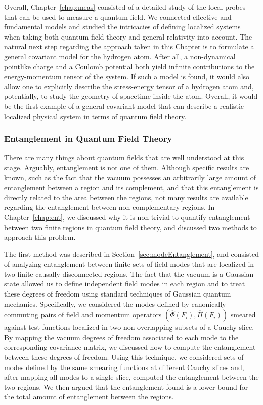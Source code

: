 \documentclass[letterpaper,12pt,titlepage,oneside,final]{book}
\begin{document}
Overall, Chapter~\ref{chap:meas} consisted of a detailed study of the local probes that can be used to measure a quantum field. We connected effective and fundamental models and studied the intricacies of defining localized systems when taking both quantum field theory and general relativity into account. The natural next step regarding the approach taken in this Chapter is to formulate a general covariant model for the hydrogen atom. After all, a non-dynamical pointlike charge and a Coulomb potential both yield infinite contributions to the energy-momentum tensor of the system. If such a model is found, it would also allow one to explicitly describe the stress-energy tensor of a hydrogen atom and, potentially, to study the geometry of spacetime inside the atom. Overall, it would be the first example of a general covariant model that can describe a realistic localized physical system in terms of quantum field theory.

\subsubsection*{Entanglement in Quantum Field Theory}

There are many things about quantum fields that are well understood at this stage. Arguably, entanglement is not one of them. Although specific results are known, such as the fact that the vacuum possesses an arbitrarily large amount of entanglement between a region and its complement, and that this entanglement is directly related to the area between the regions, not many results are available regarding the entanglement between non-complementary regions. In Chapter~\ref{chap:ent}, we discussed why it is non-trivial to quantify entanglement between two finite regions in quantum field theory, and discussed two methods to approach this problem.

The first method was described in Section~\ref{sec:modeEntanglement}, and consisted of analyzing entanglement between finite sets of field modes that are localized in two finite causally disconnected regions. The fact that the vacuum is a Gaussian state allowed us to define independent field modes in each region and to treat these degrees of freedom using standard techniques of Gaussian quantum mechanics. Specifically, we considered the modes defined by canonically commuting pairs of field and momentum operators $(\hat{\Phi}(F_i),\hat{\Pi}(F_i))$ smeared against test functions localized in two non-overlapping subsets of a Cauchy slice. By mapping the vacuum degrees of freedom associated to each mode to the corresponding covariance matrix, we discussed how to compute the entanglement between these degrees of freedom. Using this technique, we considered sets of modes defined by the same smearing functions at different Cauchy slices and, after mapping all modes to a single slice, computed the entanglement between the two regions. We then argued that the entanglement found is a lower bound for the total amount of entanglement between the regions. 
\end{document}
